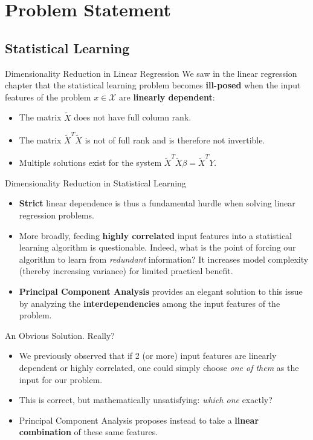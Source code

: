\section[Problem Statement]{Problem Statement}

\subsection[Statistical Learning]{Statistical Learning}

\begin{frame}{Dimensionality Reduction in Linear Regression}
	We saw in the linear regression chapter that the statistical learning problem becomes \textbf{ill-posed} when the input features of the problem $x \in \mathcal{X}$ are \textbf{linearly dependent}:
	\begin{itemize}
		\item The matrix $\tilde{X}$ does not have full column rank.
		\item The matrix $\tilde{X}^T \tilde{X}$ is not of full rank and is therefore not invertible.
		\item Multiple solutions exist for the system $\tilde{X}^T \tilde{X} \beta = \tilde{X}^T Y$.
	\end{itemize}
\end{frame}

\begin{frame}{Dimensionality Reduction in Statistical Learning}
	\begin{itemize}
		\item \textbf{Strict} linear dependence is thus a fundamental hurdle when solving linear regression problems.
		\pause 
		\item More broadly, feeding \textbf{highly correlated} input features into a statistical learning algorithm is questionable. Indeed, what is the point of forcing our algorithm to learn from \textit{redundant} information? It increases model complexity (thereby increasing variance) for limited practical benefit.
		\pause
		\item \textbf{Principal Component Analysis} provides an elegant solution to this issue by analyzing the \textbf{interdependencies} among the input features of the problem.
	\end{itemize}
\end{frame}

\begin{frame}{An Obvious Solution. Really?}
	\begin{itemize}
		\item We previously observed that if 2 (or more) input features are linearly dependent or highly correlated, one could simply choose \textit{one of them} as the input for our problem.
		\pause
		\item This is correct, but mathematically unsatisfying: \textit{which one} exactly?
		\pause
		\item Principal Component Analysis proposes instead to take a \textbf{linear combination} of these same features.
	\end{itemize}
\end{frame}

